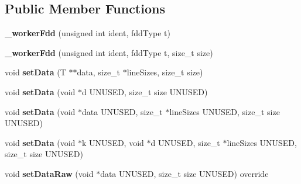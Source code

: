 \subsection*{Public Member Functions}
\begin{DoxyCompactItemize}
\item 
\hypertarget{classfaster_1_1__workerFdd_3_01T_01_5_01_4_a47e31872160658985595a45cb4a546a7}{}{\bfseries \+\_\+worker\+Fdd} (unsigned int ident, fdd\+Type t)\label{classfaster_1_1__workerFdd_3_01T_01_5_01_4_a47e31872160658985595a45cb4a546a7}

\item 
\hypertarget{classfaster_1_1__workerFdd_3_01T_01_5_01_4_a9bdf0205db584c51f2160d158629b979}{}{\bfseries \+\_\+worker\+Fdd} (unsigned int ident, fdd\+Type t, size\+\_\+t size)\label{classfaster_1_1__workerFdd_3_01T_01_5_01_4_a9bdf0205db584c51f2160d158629b979}

\item 
\hypertarget{classfaster_1_1__workerFdd_3_01T_01_5_01_4_a6c828c7980659ae657bae25e4bbbf7b0}{}void {\bfseries set\+Data} (T $\ast$$\ast$data, size\+\_\+t $\ast$line\+Sizes, size\+\_\+t size)\label{classfaster_1_1__workerFdd_3_01T_01_5_01_4_a6c828c7980659ae657bae25e4bbbf7b0}

\item 
\hypertarget{classfaster_1_1__workerFdd_3_01T_01_5_01_4_ad6c9ec2e14d529ef574ed3031749baf1}{}void {\bfseries set\+Data} (void $\ast$d U\+N\+U\+S\+E\+D, size\+\_\+t size U\+N\+U\+S\+E\+D)\label{classfaster_1_1__workerFdd_3_01T_01_5_01_4_ad6c9ec2e14d529ef574ed3031749baf1}

\item 
\hypertarget{classfaster_1_1__workerFdd_3_01T_01_5_01_4_ab0b7a6bb56047036f6bf2a30f509303f}{}void {\bfseries set\+Data} (void $\ast$data U\+N\+U\+S\+E\+D, size\+\_\+t $\ast$line\+Sizes U\+N\+U\+S\+E\+D, size\+\_\+t size U\+N\+U\+S\+E\+D)\label{classfaster_1_1__workerFdd_3_01T_01_5_01_4_ab0b7a6bb56047036f6bf2a30f509303f}

\item 
\hypertarget{classfaster_1_1__workerFdd_3_01T_01_5_01_4_a697ae8111ed8aaad17c1d739894e449f}{}void {\bfseries set\+Data} (void $\ast$k U\+N\+U\+S\+E\+D, void $\ast$d U\+N\+U\+S\+E\+D, size\+\_\+t $\ast$line\+Sizes U\+N\+U\+S\+E\+D, size\+\_\+t size U\+N\+U\+S\+E\+D)\label{classfaster_1_1__workerFdd_3_01T_01_5_01_4_a697ae8111ed8aaad17c1d739894e449f}

\item 
\hypertarget{classfaster_1_1__workerFdd_3_01T_01_5_01_4_a4718bba9d9bf44a30c74bd38b426a9cd}{}void {\bfseries set\+Data\+Raw} (void $\ast$data U\+N\+U\+S\+E\+D, size\+\_\+t size U\+N\+U\+S\+E\+D) override\label{classfaster_1_1__workerFdd_3_01T_01_5_01_4_a4718bba9d9bf44a30c74bd38b426a9cd}


\end{DoxyCompactItemize}

